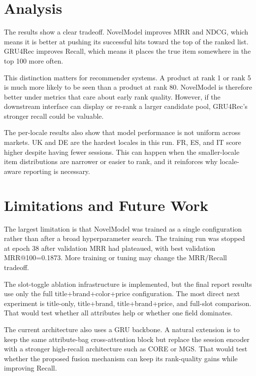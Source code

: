 \documentclass[11pt]{article}
\newcommand{\metric}[1]{\textsc{#1}}
\begin{document}
\section{Analysis}

The results show a clear tradeoff. NovelModel improves MRR and NDCG, which means it is better at pushing its successful hits toward the top of the ranked list. GRU4Rec improves Recall, which means it places the true item somewhere in the top 100 more often.

This distinction matters for recommender systems. A product at rank 1 or rank 5 is much more likely to be seen than a product at rank 80. NovelModel is therefore better under metrics that care about early rank quality. However, if the downstream interface can display or re-rank a larger candidate pool, GRU4Rec's stronger recall could be valuable.

The per-locale results also show that model performance is not uniform across markets. UK and DE are the hardest locales in this run. FR, ES, and IT score higher despite having fewer sessions. This can happen when the smaller-locale item distributions are narrower or easier to rank, and it reinforces why locale-aware reporting is necessary.

\section{Limitations and Future Work}

The largest limitation is that NovelModel was trained as a single configuration rather than after a broad hyperparameter search. The training run was stopped at epoch 38 after validation MRR had plateaued, with best validation \metric{MRR@100}=0.1873. More training or tuning may change the MRR/Recall tradeoff.

The slot-toggle ablation infrastructure is implemented, but the final report results use only the full title+brand+color+price configuration. The most direct next experiment is title-only, title+brand, title+brand+price, and full-slot comparison. That would test whether all attributes help or whether one field dominates.

The current architecture also uses a GRU backbone. A natural extension is to keep the same attribute-bag cross-attention block but replace the session encoder with a stronger high-recall architecture such as CORE or MGS. That would test whether the proposed fusion mechanism can keep its rank-quality gains while improving Recall.
\end{document}

